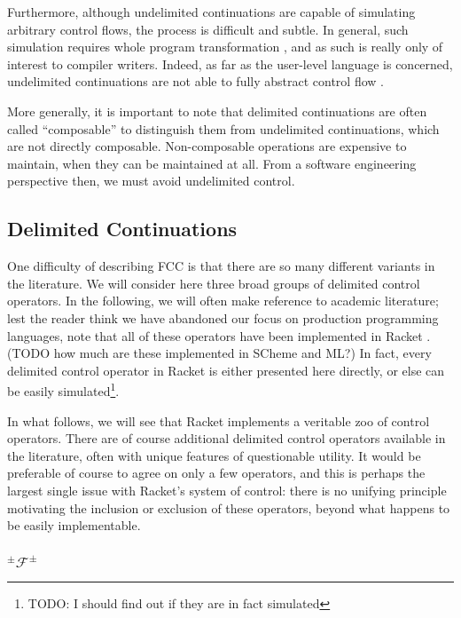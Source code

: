 \documentclass[11pt]{article}
\newcommand\F{\mathcal{F}}
\newcommand\pmFpm{^\pm\F^\pm}
\begin{document}
Furthermore, although undelimited continuations are capable of simulating arbitrary control flows, the process is difficult and subtle.
In general, such simulation requires whole program transformation \cite{Filinski94}, and as such is really only of interest to compiler writers.
Indeed, as far as the user-level language is concerned, undelimited continuations are not able to fully abstract control flow \cite{Sitaram90}.

More generally, it is important to note that delimited continuations are often called ``composable'' to distinguish them from undelimited continuations, which are not directly composable.
Non-composable operations are expensive to maintain, when they can be maintained at all.
From a software engineering perspective then, we must avoid undelimited control.

\subsection{Delimited Continuations}
\label{delimControl}

One difficulty of describing FCC is that there are so many different variants in the literature.
We will consider here three broad groups of delimited control operators.
In the following, we will often make reference to academic literature;
lest the reader think we have abandoned our focus on production programming languages, note that all of these operators have been implemented in Racket \cite{RacketReference}. 
(TODO how much are these implemented in SCheme and ML?)
In fact, every delimited control operator in Racket is either presented here directly, or else can be easily simulated\footnote{TODO: I should find out if they are in fact simulated}.

In what follows, we will see that Racket implements a veritable zoo of control operators.
There are of course additional delimited control operators available in the literature, often with unique features of questionable utility.
It would be preferable of course to agree on only a few operators, and this is perhaps the largest single issue with Racket's system of control: there is no unifying principle motivating the inclusion or exclusion of these operators, beyond what happens to be easily implementable.

\subsubsection{$\pmFpm$}
\end{document}
